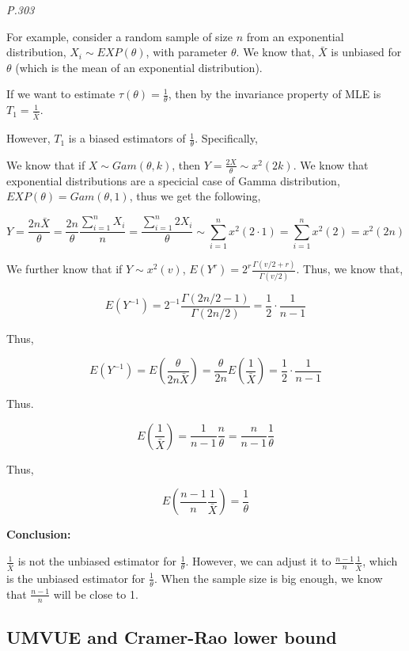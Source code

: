 \documentclass[]{book}
\begin{document}
\emph{P.303}

For example, consider a random sample of size \(n\) from an exponential distribution, \(X_i \sim EXP(\theta)\), with parameter \(\theta\). We know that, \(\bar{X}\) is unbiased for \(\theta\) (which is the mean of an exponential distribution).

If we want to estimate \(\tau(\theta)=\frac{1}{\theta}\), then by the invariance property of MLE is \(T_1=\frac{1}{\bar{X}}\).

However, \(T_1\) is a biased estimators of \(\frac{1}{\theta}\). Specifically,

We know that if \(X \sim Gam(\theta,k)\), then \(Y=\frac{2X}{\theta} \sim x^2(2k)\). We know that exponential distributions are a specicial case of Gamma distribution, \(EXP(\theta)=Gam(\theta,1)\), thus we get the following,

\[Y=\frac{2n\bar{X}}{\theta}=\frac{2n}{\theta} \frac{\sum_{i=1}^n X_i}{n}=\frac{\sum_{i=1}^n 2X_i}{\theta}\sim\sum_{i=1}^n x^2(2\cdot1)=\sum_{i=1}^n x^2(2)=x^2(2n)\]

We further know that if \(Y \sim x^2(v)\), \(E(Y^r)=2^r\frac{\Gamma(v/2+r)}{\Gamma(v/2)}\). Thus, we know that,

\[E(Y^{-1})=2^{-1} \frac{\Gamma(2n/2-1)}{\Gamma(2n/2)}=\frac{1}{2}\cdot \frac{1}{n-1}\]

Thus,

\[E(Y^{-1})=E(\frac{\theta}{2n \bar{X}})=\frac{\theta}{2n}E(\frac{1}{\bar{X}})=\frac{1}{2}\cdot \frac{1}{n-1}\]

Thus.

\[E(\frac{1}{\bar{X}})=\frac{1}{n-1}\frac{n}{\theta}=\frac{n}{n-1}\frac{1}{\theta}\]

Thus,

\[E(\frac{n-1}{n} \frac{1}{\bar{X}})=\frac{1}{\theta}\]

\textbf{Conclusion:}

\(\frac{1}{\bar{X}}\) is not the unbiased estimator for \(\frac{1}{\theta}\). However, we can adjust it to \(\frac{n-1}{n} \frac{1}{\bar{X}}\), which is the unbiased estimator for \(\frac{1}{\theta}\). When the sample size is big enough, we know that \(\frac{n-1}{n}\) will be close to 1.

\hypertarget{umvue-and-cramer-rao-lower-bound}{%
\subsection{UMVUE and Cramer-Rao lower bound}\label{umvue-and-cramer-rao-lower-bound}}
\end{document}
